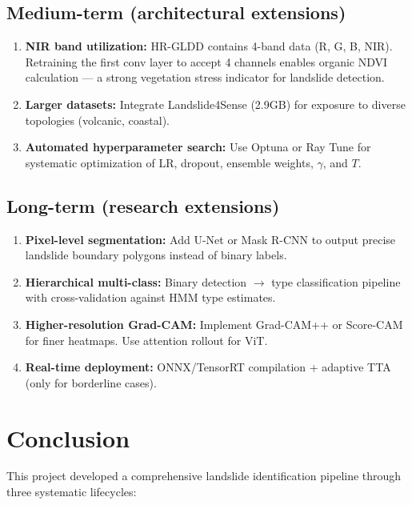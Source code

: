 \documentclass[11pt]{article}
\begin{document}
\subsection{Medium-term (architectural extensions)}

\begin{enumerate}
    \item \textbf{NIR band utilization:} HR-GLDD contains 4-band data (R, G, B, NIR). Retraining the first conv layer to accept 4 channels enables organic NDVI calculation --- a strong vegetation stress indicator for landslide detection.
    \item \textbf{Larger datasets:} Integrate Landslide4Sense (2.9GB) for exposure to diverse topologies (volcanic, coastal).
    \item \textbf{Automated hyperparameter search:} Use Optuna or Ray Tune for systematic optimization of LR, dropout, ensemble weights, $\gamma$, and $T$.
\end{enumerate}

\subsection{Long-term (research extensions)}

\begin{enumerate}
    \item \textbf{Pixel-level segmentation:} Add U-Net or Mask R-CNN to output precise landslide boundary polygons instead of binary labels.
    \item \textbf{Hierarchical multi-class:} Binary detection $\to$ type classification pipeline with cross-validation against HMM type estimates.
    \item \textbf{Higher-resolution Grad-CAM:} Implement Grad-CAM++ or Score-CAM for finer heatmaps. Use attention rollout for ViT.
    \item \textbf{Real-time deployment:} ONNX/TensorRT compilation + adaptive TTA (only for borderline cases).
\end{enumerate}

\section{Conclusion}

This project developed a comprehensive landslide identification pipeline through three systematic lifecycles:
\end{document}
